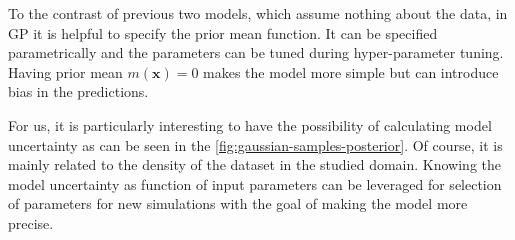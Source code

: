 To the contrast of previous two models, which assume nothing about the data, in GP it is helpful to specify the prior mean function. It can be specified parametrically and the parameters can be tuned during hyper-parameter tuning. Having prior mean $m(\bm{x}) = 0$ makes the model more simple but can introduce bias in the predictions.

For us, it is particularly interesting to have the possibility of calculating model uncertainty as can be seen in the \ref{fig:gaussian-samples-posterior}. Of course, it is mainly related to the density of the dataset in the studied domain. Knowing the model uncertainty as function of input parameters can be leveraged for selection of parameters for new simulations with the goal of making the model more precise.

